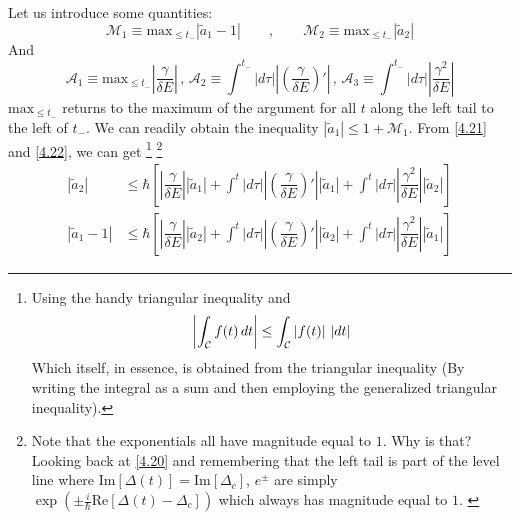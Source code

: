 \documentclass[12pt,a4paper]{article}
\begin{document}
	Let us introduce some quantities:
	\begin{equation}
		\mathcal{M}_{1} \equiv \mathrm{max}_{\leq t_{-}} \left| \tilde{a}_{1} - 1 \right| \qquad , \qquad \mathcal{M}_{2} \equiv \mathrm{max}_{\leq t_{-}} \left| \tilde{a}_{2} \right| \label{4.23}
	\end{equation}
	And
	\begin{equation}
		\mathcal{A}_{1} \equiv \mathrm{max}_{\leq t_{-}} \left| \dfrac{\gamma}{\delta E} \right| \, , \, \mathcal{A}_{2} \equiv \int^{t_{-}} \left| d\tau \right| \left| \left( \dfrac{\gamma}{\delta E} \right)' \right| \, , \, \mathcal{A}_{3} \equiv \int^{t_{-}} \left| d\tau \right| \left| \dfrac{\gamma^{2}}{\delta E} \right| \label{4.24}
	\end{equation}
	$\mathrm{max}_{\leq t_{-}}$ returns to the maximum of the argument for all $t$ along the left tail to the left of $t_{-}$. We can readily obtain the inequality $\left| \tilde{a}_{1} \right| \leq 1 + \mathcal{M}_{1}$. From \eqref{4.21} and \eqref{4.22}, we can get \footnote{Using the handy triangular inequality and
	\begin{equation}
		\left| \int_{\mathcal{C}} f(t)\, dt \right| \leq \int_{\mathcal{C}} \left| f(t) \right|\, \left| dt \right| \notag
	\end{equation}
	Which itself, in essence, is obtained from the triangular inequality (By writing the integral as a sum and then employing the generalized triangular inequality).} \footnote{Note that the exponentials all have magnitude equal to $1$. Why is that? Looking back at \eqref{4.20} and remembering that the left tail is part of the level line where $\mathrm{Im}[\Delta(t)] = \mathrm{Im}[\Delta_{c}]$, $e^{\pm}$ are simply $\exp\left( \pm \frac{i}{\hbar} \mathrm{Re}\left[ \Delta(t) - \Delta_{c} \right] \right)$ which always has magnitude equal to $1$. \label{footnote:8}} 
	\begin{align}
		\left| \tilde{a}_{2} \right| &\leq \hbar \left[ \left| \dfrac{\gamma}{\delta E} \right| \left| \tilde{a}_{1} \right| + \int^{t} \left| d\tau \right| \left| \left( \dfrac{\gamma}{\delta E} \right)' \right| \left| \tilde{a}_{1} \right| + \int^{t} \left| d\tau \right| \left| \dfrac{\gamma^{2}}{\delta E} \right| \left| \tilde{a}_{2} \right| \right] \label{4.25} \\[5pt]
		\left| \tilde{a}_{1} - 1 \right| &\leq \hbar \left[ \left| \dfrac{\gamma}{\delta E} \right| \left| \tilde{a}_{2} \right| + \int^{t} \left| d\tau \right| \left| \left( \dfrac{\gamma}{\delta E} \right)' \right| \left| \tilde{a}_{2} \right| + \int^{t} \left| d\tau \right| \left| \dfrac{\gamma^{2}}{\delta E} \right| \left| \tilde{a}_{1} \right| \right] \label{4.26}
	\end{align}
\end{document}
